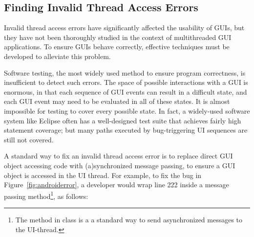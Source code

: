 


\subsection{Finding Invalid Thread Access Errors}
\label{sec:finding}

Invalid thread access errors have significantly affected the
usability of GUIs, but they have not been thoroughly studied in
the context of multithreaded GUI applications. To ensure GUIs
behave correctly, effective techniques must be developed to alleviate this problem.

Software testing, the most widely used method to ensure program correctness,
is insufficient to detect such errors. The space of possible interactions
with a GUI is enormous, in that each sequence of GUI events can result in
a difficult state, and each GUI event may need to be evaluated in all of
these states. It is almost impossible for testing to cover every possible
state. In fact, a widely-used software system like Eclipse
often has a well-designed test suite that achieves fairly high statement coverage;
but many paths executed by bug-triggering UI sequences are still not covered.



A standard way to fix an
invalid thread access error is to replace direct GUI object accessing code 
with (a)synchronized message passing, to ensure a GUI object is accessed in
the UI thread. For example, to fix the bug in Figure~\ref{fig:androiderror},
a developer would wrap line 222 inside a  message passing method\footnote{The
 method in class  is a
a standard way to send asynchronized messages to the UI-thread.}, as follows:


